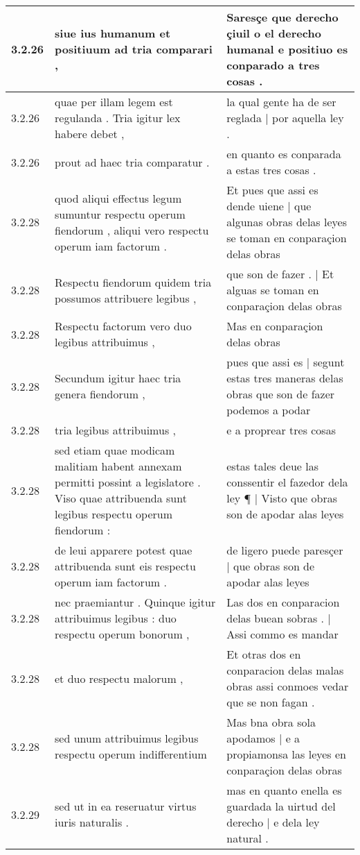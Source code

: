 \begin{tabular}{|p{1cm}|p{6.5cm}|p{6.5cm}|}
3.2.26 & siue ius humanum et positiuum ad tria comparari , & Saresçe que derecho çiuil o el derecho humanal e positiuo es conparado a tres cosas . \\\hline
3.2.26 & quae per illam legem est regulanda . Tria igitur lex habere debet , & la qual gente ha de ser reglada | por aquella ley . \\\hline
3.2.26 & prout ad haec tria comparatur . & en quanto es conparada a estas tres cosas . \\\hline
3.2.28 & quod aliqui effectus legum sumuntur respectu operum fiendorum , aliqui vero respectu operum iam factorum . & Et pues que assi es dende uiene | que algunas obras delas leyes se toman en conparaçion delas obras \\\hline
3.2.28 & Respectu fiendorum quidem tria possumos attribuere legibus , & que son de fazer . | Et alguas se toman en conparaçion delas obras \\\hline
3.2.28 & Respectu factorum vero duo legibus attribuimus , & Mas en conparaçion delas obras \\\hline
3.2.28 & Secundum igitur haec tria genera fiendorum , & pues que assi es | segunt estas tres maneras delas obras que son de fazer podemos a podar \\\hline
3.2.28 & tria legibus attribuimus , & e a proprear tres cosas \\\hline
3.2.28 & sed etiam quae modicam malitiam habent annexam permitti possint a legislatore . Viso quae attribuenda sunt legibus respectu operum fiendorum : & estas tales deue las conssentir el fazedor dela ley ¶ | Visto que obras son de apodar alas leyes \\\hline
3.2.28 & de leui apparere potest quae attribuenda sunt eis respectu operum iam factorum . & de ligero puede paresçer | que obras son de apodar alas leyes \\\hline
3.2.28 & nec praemiantur . Quinque igitur attribuimus legibus : duo respectu operum bonorum , & Las dos en conparacion delas buean sobras . | Assi commo es mandar \\\hline
3.2.28 & et duo respectu malorum , & Et otras dos en conparacion delas malas obras assi conmoes vedar que se non fagan . \\\hline
3.2.28 & sed unum attribuimus legibus respectu operum indifferentium & Mas bna obra sola apodamos | e a propiamonsa las leyes en conparaçion delas obras \\\hline
3.2.29 & sed ut in ea reseruatur virtus iuris naturalis . & mas en quanto enella es guardada la uirtud del derecho | e dela ley natural . \\\hline

\end{tabular}
